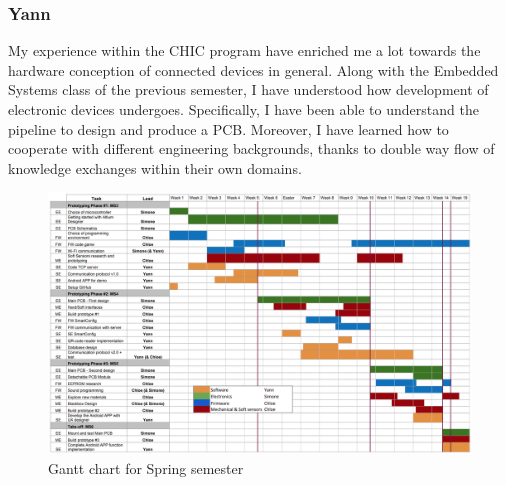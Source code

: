 \subsubsection{Yann}
My experience within the CHIC program have enriched me a lot towards the hardware conception of connected devices in general. Along with the Embedded Systems class of the previous semester, I have understood how development of electronic devices undergoes. Specifically, I have been able to understand the pipeline to design and produce a PCB. Moreover, I have learned how to cooperate with different engineering backgrounds, thanks to double way flow of knowledge exchanges within their own domains. 

\begin{figure}
    \includegraphics[scale=0.45]{images/gantt.png}
    \caption{Gantt chart for Spring semester}
    \label{fig:gantt}
\end{figure}
